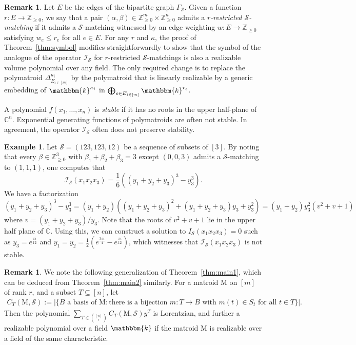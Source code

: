 \documentclass{amsart}
\newcommand{\CC}{\mathbb C}
\newcommand{\ZZ}{\mathbb Z}
\newcommand{\M}{\mathrm{M}}
\newcommand{\kk}{\mathbbm{k}}
\theoremstyle{plain}
\theoremstyle{definition}
\newtheorem{eg}[thm]{Example}
\newtheorem{rem}[thm]{Remark}
\begin{document}
\begin{rem}
Let $E$ be the edges of the bipartite graph $\Gamma_{\mathcal S}$.
Given a function $r: E \to \ZZ_{\geq 0}$, we say that a pair $(\alpha, \beta)\in \ZZ_{\geq 0}^m \times \ZZ_{\geq 0}^n$ admits a \emph{$r$-restricted $\mathcal S$-matching} if it admits a $\mathcal S$-matching witnessed by an edge weighting $w: E\to \ZZ_{\geq 0}$ satisfying $w_e \leq r_e$ for all $e\in E$.  For any $r$ and $\kappa$, the proof of Theorem~\ref{thm:symbol} modifies straightforwardly to show that the symbol of the analogue of the operator $\mathcal I_{\mathcal S}$ for $r$-restricted $\mathcal S$-matchings is also a realizable volume polynomial over any field.  The only required change is to replace the polymatroid $\Delta^{\kappa_i}_{E_{i\in [m]}}$ by the polymatroid that is linearly realizable by a generic embedding of $\kk^{\kappa_i}$ in $\bigoplus_{e\in E_{i\in [m]}} \kk^{r_e}$.
\end{rem}

A polynomial $f(x_1, \dotsc, x_n)$ is \emph{stable} if it has no roots in the upper half-plane of $\CC^n$.  Exponential generating functions of polymatroids are often not stable.  In agreement, the operator $\mathcal I_{\mathcal S}$ often does not preserve stability.

\begin{eg}\label{eg:notstable}
Let $\mathcal{S}=(123,123,12)$ be a sequence of subsets of $[3]$.
By noting that every $\beta \in \ZZ_{\geq 0}^3$ with $\beta_1 + \beta_2 + \beta_3 = 3$  except $(0,0,3)$ admits a $\mathcal S$-matching to $(1,1,1)$, one computes that
\[
\mathcal I_{\mathcal S}(x_1x_2x_3) = \frac{1}{6}((y_1+y_2+y_3)^3-y_3^3).\]
We have a factorization
$$(y_1+y_2+y_3)^3-y_3^3=(y_1+y_2)((y_1+y_2+y_3)^2+(y_1+y_2+y_3)y_3+y_3^2)=(y_1+y_2)y_3^2(v^2+v+1)$$ where $v = (y_1+y_2+y_3)/y_3.$
Note that the roots of $v^2+v+1$ lie in the upper half plane of $\CC$.  Using this, we can construct a solution to $I_{\mathcal S}(x_1x_2x_3) = 0$ such as $y_3 = e^\frac{\pi i}{12}$ and $y_1=y_2=\frac{1}{2}(e^{\frac{3\pi i}{4}} - e^{\frac{\pi i}{12}})$, which witnesses that $\mathcal I_{\mathcal S}(x_1x_2x_3)$ is not stable.
\end{eg}



\begin{rem}
We note the following generalization of Theorem~\ref{thm:main1}, which can be deduced from Theorem~\ref{thm:main2} similarly.  For a matroid $\M$ on $[m]$ of rank $r$, and a subset $T\subseteq [n]$, let
\begin{align*}
C_T(\M,\mathcal S) := |\{B \text{ a basis of }\M : \text{there is a bijection $m: T \to B$ with $m(t) \in S_t$ for all $t\in T$}\}|.
\end{align*}
Then the polynomial $\sum_{T\in \binom{[n]}{r}} C_T(\M,\mathcal S) y^T$ is Lorentzian, and further a realizable polynomial over a field $\kk$ if the matroid $\M$ is realizable over a field of the same characteristic.
\end{rem}
\end{document}
